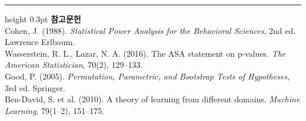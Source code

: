 \documentclass[10pt]{article}
\begin{document}
\vspace{0.6em}
\hrule height 0.3pt
\vspace{0.5em}
{\footnotesize
\textbf{참고문헌}\\[0.3em]
Cohen, J. (1988). \emph{Statistical Power Analysis for the Behavioral Sciences},
2nd ed. Lawrence Erlbaum.\\[0.15em]
Wasserstein, R. L., Lazar, N. A. (2016). The ASA statement on p-values.
\emph{The American Statistician}, 70(2), 129--133.\\[0.15em]
Good, P. (2005). \emph{Permutation, Parametric, and Bootstrap Tests of Hypotheses},
3rd ed. Springer.\\[0.15em]
Ben-David, S. et al. (2010). A theory of learning from different domains.
\emph{Machine Learning}, 79(1--2), 151--175.
}
\end{document}
